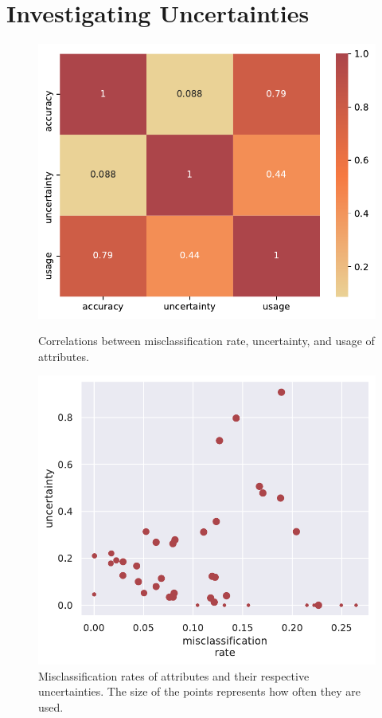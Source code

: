 \documentclass[a4paper,cleardoubleempty,BCOR1cm, 11pt]{report}
\begin{document}
\section{Investigating Uncertainties}
\begin{figure}
	\centering
	\begin{minipage}[t]{0.45\textwidth}
		\centering
		\includegraphics[width=1\textwidth]{images/corr_matrix.pdf}
		\caption{Correlations between misclassification rate, uncertainty, and usage of attributes.}
		\label{fig:corr_matrix}
	\end{minipage}\hfill
	\begin{minipage}[t]{0.45\textwidth}
		\centering
		\includegraphics[width=1\textwidth]{images/error_sigma_corr_all.pdf} 
		\caption{Misclassification rates of attributes and their respective uncertainties. The size of the points represents how often they are used.}
		\label{fig:correlations}
	\end{minipage}
\end{figure}
\end{document}
